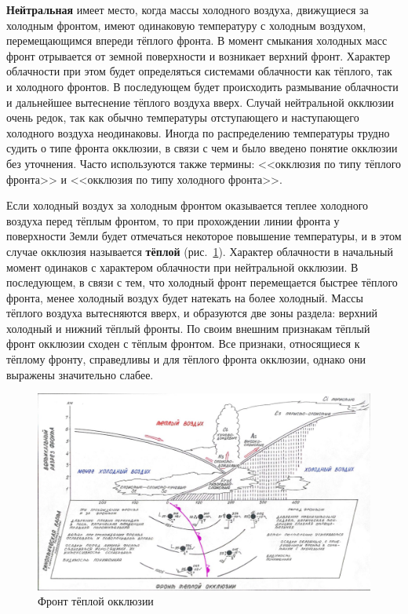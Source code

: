 \documentclass[a4paper, 12pt, twoside, final, book, russian, fittopage, cyremdash, openright]{ncc}
\begin{document}
\textbf{Нейтральная} имеет место,
когда массы холодного воздуха, движущиеся за холодным фронтом, имеют
одинаковую температуру с холодным воздухом, перемещающимся впереди
тёплого фронта. В момент смыкания холодных масс фронт отрывается от
земной поверхности и возникает верхний фронт. Характер облачности при
этом будет определяться системами облачности как тёплого, так и
холодного фронтов. В последующем будет происходить размывание
облачности и дальнейшее вытеснение тёплого воздуха вверх. Случай
нейтральной окклюзии очень редок, так как обычно температуры
отступающего и наступающего холодного воздуха неодинаковы. Иногда по
распределению температуры трудно судить о типе фронта окклюзии, в
связи с чем и было введено понятие окклюзии без уточнения. Часто
используются также термины: <<окклюзия по типу тёплого фронта>> и
<<окклюзия по типу холодного фронта>>.

Если холодный воздух за холодным фронтом оказывается теплее холодного
воздуха перед тёплым фронтом, то при прохождении линии фронта у
поверхности Земли будет отмечаться некоторое повышение температуры, и
в этом случае окклюзия называется \textbf{тёплой}
(рис.~\ref{fig:10_warm_ocl_front}). Характер облачности в начальный
момент одинаков с характером облачности при нейтральной окклюзии. В
последующем, в связи с тем, что холодный фронт перемещается быстрее
тёплого фронта, менее холодный воздух будет натекать на более
холодный. Массы тёплого воздуха вытесняются вверх, и образуются две
зоны раздела: верхний холодный и нижний тёплый фронты. По своим
внешним признакам тёплый фронт окклюзии сходен с тёплым фронтом. Все
признаки, относящиеся к тёплому фронту, справедливы и для тёплого
фронта окклюзии, однако они выражены значительно слабее.

\begin{figure}[htb]
   \centering
   \includegraphics[scale=0.7]{10_warm_ocl_front.pdf}
   \caption{Фронт тёплой окклюзии}
   \label{fig:10_warm_ocl_front}
\end{figure}
\end{document}
